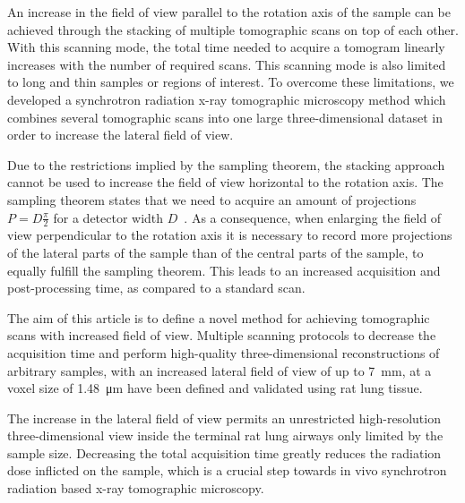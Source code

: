 An increase in the field of view parallel to the rotation axis of the sample can be achieved through the stacking of multiple tomographic scans on top of each other. With this scanning mode, the total time needed to acquire a tomogram linearly increases with the number of required scans. This scanning mode is also limited to long and thin samples or regions of interest. To overcome these limitations, we developed a synchrotron radiation x-ray tomographic microscopy method which combines several tomographic scans into one large three-dimensional dataset in order to increase the lateral field of view.

Due to the restrictions implied by the sampling theorem, the stacking approach cannot be used to increase the field of view horizontal to the rotation axis. The sampling theorem states that we need to acquire an amount of projections $P=D\frac{\pi}{2}$ for a detector width $D$~\cite[page 186]{Kak2002}. As a consequence, when enlarging the field of view perpendicular to the rotation axis it is necessary to record more projections of the lateral parts of the sample than of the central parts of the sample, to equally fulfill the sampling theorem. This leads to an increased acquisition and post-processing time, as compared to a standard scan.

The aim of this article is to define a novel method for achieving tomographic scans with increased field of view. Multiple scanning protocols to decrease the acquisition time and perform high-quality three-dimensional reconstructions of arbitrary samples, with an increased lateral field of view of up to \SI{7}{\milli\meter}, at a voxel size of \SI{1.48}{\micro\meter} have been defined and validated using rat lung tissue.

The increase in the lateral field of view permits an unrestricted high-resolution three-dimensional view inside the terminal rat lung airways only limited by the sample size. Decreasing the total acquisition time greatly reduces the radiation dose inflicted on the sample, which is a crucial step towards in vivo synchrotron radiation based x-ray tomographic microscopy.